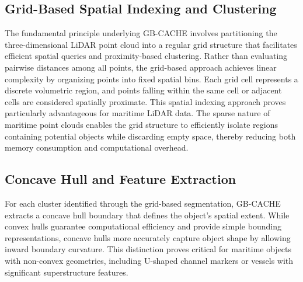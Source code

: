 \documentclass{erauthesis}
\begin{document}
\subsection{Grid-Based Spatial Indexing and Clustering} \label{gbcache_clustering}

The fundamental principle underlying GB-CACHE involves partitioning the three-dimensional LiDAR point cloud into a regular grid structure that facilitates efficient spatial queries and proximity-based clustering. Rather than evaluating pairwise distances among all points, the grid-based approach achieves linear complexity by organizing points into fixed spatial bins. Each grid cell represents a discrete volumetric region, and points falling within the same cell or adjacent cells are considered spatially proximate.
This spatial indexing approach proves particularly advantageous for maritime LiDAR data. 
The sparse nature of maritime point clouds enables the grid structure to efficiently isolate regions containing potential objects while discarding empty space, thereby reducing both memory consumption and computational overhead.


\subsection{Concave Hull and Feature Extraction} \label{gbcache_features}

For each cluster identified through the grid-based segmentation, GB-CACHE extracts a concave hull boundary that defines the object's spatial extent. 
While convex hulls guarantee computational efficiency and provide simple bounding representations, concave hulls more accurately capture object shape by allowing inward boundary curvature. 
This distinction proves critical for maritime objects with non-convex geometries, including U-shaped channel markers or vessels with significant superstructure features.
\end{document}

